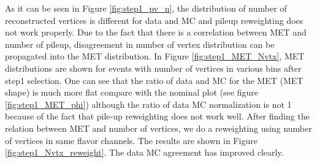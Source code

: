 As it can be seen in Figure \ref{fig:step1_pv_n}, the distribution of number of reconstructed vertices is different for data and MC and pileup reweighting does not work properly.
Due to the fact that there is a correlation between MET and number of pileup, disagreement in number of vertex distribution can be propagated into the MET distribution.
In Figure \ref{fig:step1_MET_Nvtx},  MET distributions are shown for events with number
of vertices in various bins  after step1 selection. One can see that the ratio of data and MC for the MET (MET shape) is
much more flat compare with the nominal plot (see figure
\ref{fig:step1_MET_phi}) although the ratio of data MC normalization is not 1 because of the fact that pile-up
reweighting does not work well. After finding the relation between MET and number
of vertices, we do a reweighting using number of vertices in same flavor channels. The results
are shown in Figure \ref{fig:step1_Nvtx_reweight}. The data MC agreement has improved clearly.


